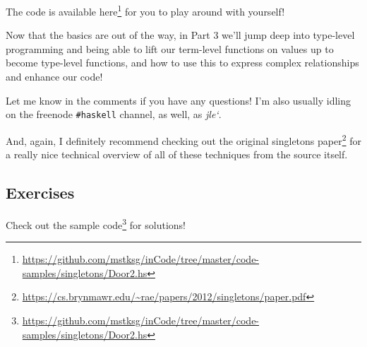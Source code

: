 \documentclass[]{article}
\renewcommand{\href}[2]{#2\footnote{\url{#1}}}
\begin{document}
The code is available
\href{https://github.com/mstksg/inCode/tree/master/code-samples/singletons/Door2.hs}{here}
for you to play around with yourself!

Now that the basics are out of the way, in Part 3 we'll jump deep into
type-level programming and being able to lift our term-level functions on values
up to become type-level functions, and how to use this to express complex
relationships and enhance our code!

Let me know in the comments if you have any questions! I'm also usually idling
on the freenode \texttt{\#haskell} channel, as well, as \emph{jle`}.

And, again, I definitely recommend checking out the
\href{https://cs.brynmawr.edu/~rae/papers/2012/singletons/paper.pdf}{original
singletons paper} for a really nice technical overview of all of these
techniques from the source itself.

\hypertarget{exercises}{%
\subsection{Exercises}\label{exercises}}

Check out the
\href{https://github.com/mstksg/inCode/tree/master/code-samples/singletons/Door2.hs}{sample
code} for solutions!
\end{document}
